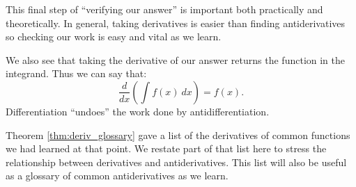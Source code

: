 This final step of ``verifying our answer'' is important both practically and theoretically. In general, taking derivatives is easier than finding antiderivatives so checking our work is easy and vital as we learn.

We also see that taking the derivative of our answer returns the function in the integrand. Thus we can say that: $$\frac{d}{dx}\left(\int f(x)\ dx\right) = f(x).$$
Differentiation ``undoes'' the work done by antidifferentiation. 

Theorem \ref{thm:deriv_glossary} gave a list of the derivatives of common functions we had learned at that point. We restate part of that list here to stress the relationship between derivatives and antiderivatives. This list will also be useful as a glossary of common antiderivatives as we learn.

\newlength{\bh}%
\newlength{\bd}%


